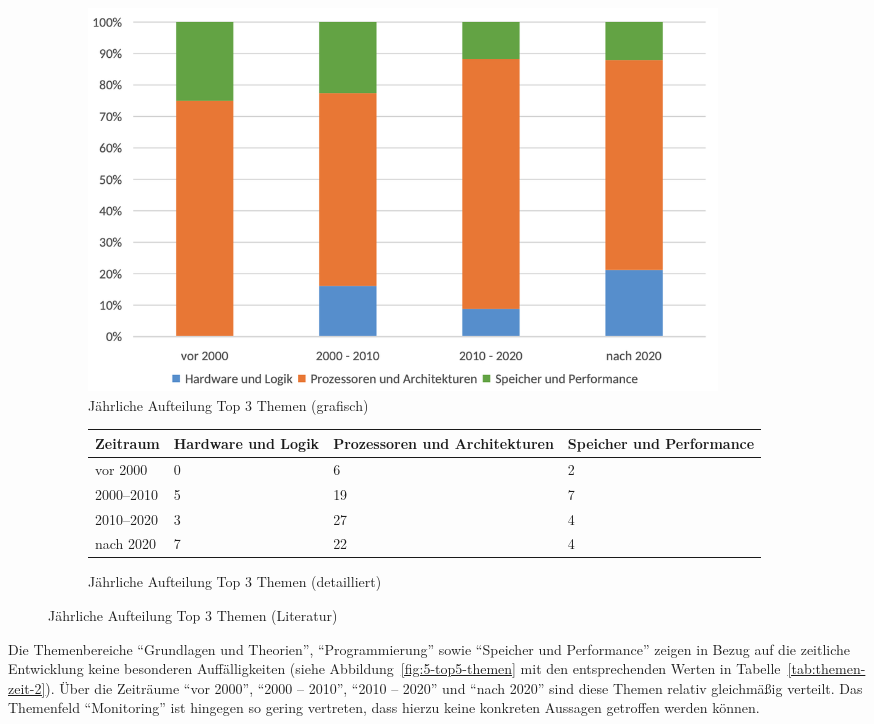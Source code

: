 \begin{figure}[!htbp]
    \centering
    \begin{subfigure}[b]{0.48\textwidth}
        \centering
        \includegraphics[width=0.90\textwidth]{graphics_lit/4-top3-themen-jahr.png}
        \caption{Jährliche Aufteilung Top 3 Themen (grafisch)}
        \label{fig:4-top3-themen}
    \end{subfigure}
    \hfill
    \begin{subfigure}[b]{0.48\textwidth}
        \centering
        \tiny
        \begin{tabularx}{\textwidth}{lXXX}
            \hline
            \textbf{Zeitraum} & \textbf{Hardware und Logik} & \textbf{Prozessoren und Architekturen} & \textbf{Speicher und Performance} \\
            \hline
            vor 2000      & 0  & 6  & 2 \\
            2000--2010    & 5  & 19 & 7 \\
            2010--2020    & 3  & 27 & 4 \\
            nach 2020     & 7  & 22 & 4 \\
            \hline
        \end{tabularx}
        \caption{Jährliche Aufteilung Top 3 Themen (detailliert)}
        \label{tab:themen-zeit}
    \end{subfigure}
    \caption{Jährliche Aufteilung Top 3 Themen (Literatur)}
    \label{fig:pub-typen}
\end{figure}

Die Themenbereiche \enquote{Grundlagen und Theorien}, \enquote{Programmierung} sowie \enquote{Speicher und Performance} zeigen in Bezug auf die zeitliche Entwicklung keine besonderen Auffälligkeiten (siehe Abbildung~\ref{fig:5-top5-themen} mit den entsprechenden Werten in Tabelle~\ref{tab:themen-zeit-2}). Über die Zeiträume \enquote{vor 2000}, \enquote{2000 -- 2010}, \enquote{2010 -- 2020} und \enquote{nach 2020} sind diese Themen relativ gleichmäßig verteilt. Das Themenfeld \enquote{Monitoring} ist hingegen so gering vertreten, dass hierzu keine konkreten Aussagen getroffen werden können.

